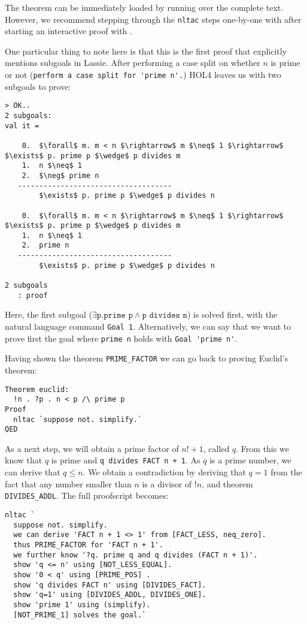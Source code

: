 The theorem can be immediately loaded by running  over the complete
text.
However, we recommend stepping through the \lstinline{nltac} steps one-by-one
with  after starting an interactive proof with .

One particular thing to note here is that this is the first proof that
explicitly mentions subgoals in Lassie.
After performing a case split on whether $n$ is prime or not
(\lstinline{perform a case split for 'prime n'.}) HOL4 leaves us with two
subgoals to prove:

\begin{lstlisting}[frame=single]
> OK..
2 subgoals:
val it =

    0.  $\forall$ m. m < n $\rightarrow$ m $\neq$ 1 $\rightarrow$ $\exists$ p. prime p $\wedge$ p divides m
    1.  n $\neq$ 1
    2.  $\neg$ prime n
   ------------------------------------
        $\exists$ p. prime p $\wedge$ p divides n

    0.  $\forall$ m. m < n $\rightarrow$ m $\neq$ 1 $\rightarrow$ $\exists$ p. prime p $\wedge$ p divides m
    1.  n $\neq$ 1
    2.  prime n
   ------------------------------------
        $\exists$ p. prime p $\wedge$ p divides n

2 subgoals
   : proof
\end{lstlisting}

Here, the first subgoal ($\exists \texttt{p}. \texttt{prime p} \wedge \texttt{p divides n}$)
is solved first, with the natural language command \lstinline{Goal 1}.
Alternatively, we can say that we want to prove first the goal where \texttt{prime n} holds with
\lstinline{Goal 'prime n'}.

Having shown the theorem \lstinline{PRIME_FACTOR} we can go back to proving
Euclid's theorem:
\begin{lstlisting}
Theorem euclid:
  !n . ?p . n < p /\ prime p
Proof
  nltac `suppose not. simplify.`
QED
\end{lstlisting}

As a next step, we will obtain a prime factor of $n! + 1$, called $q$.
From this we know that $q$ is prime and \lstinline{q divides FACT n + 1}.
As $q$ is a prime number, we can derive that $q \leq n$.
We obtain a contradiction by deriving that $q = 1$ from the fact that any number
smaller than $n$ is a divisor of $!n$, and theorem \lstinline{DIVIDES_ADDL}.
The full proofscript becomes:
\begin{lstlisting}[mathescape=true]
nltac `
  suppose not. simplify.
  we can derive 'FACT n + 1 <> 1' from [FACT_LESS, neq_zero].
  thus PRIME_FACTOR for 'FACT n + 1'.
  we further know '?q. prime q and q divides (FACT n + 1)'.
  show 'q <= n' using [NOT_LESS_EQUAL].
  show '0 < q' using [PRIME_POS] .
  show 'q divides FACT n' using [DIVIDES_FACT].
  show 'q=1' using [DIVIDES_ADDL, DIVIDES_ONE].
  show 'prime 1' using (simplify).
  [NOT_PRIME_1] solves the goal.`
\end{lstlisting}

